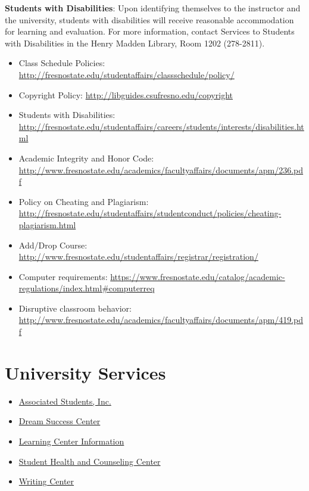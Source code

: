 \textbf{Students with Disabilities}: Upon identifying themselves to the
instructor and the university, students with disabilities will receive
reasonable accommodation for learning and evaluation. For more
information, contact Services to Students with Disabilities in the Henry
Madden Library, Room 1202 (278-2811).

\begin{itemize}
\tightlist
\item
  Class Schedule Policies:
  \url{http://fresnostate.edu/studentaffairs/classschedule/policy/}
\item
  Copyright Policy: \url{http://libguides.csufresno.edu/copyright}
\item
  Students with Disabilities:
  \url{http://fresnostate.edu/studentaffairs/careers/students/interests/disabilities.html}
\item
  Academic Integrity and Honor Code:
  \url{http://www.fresnostate.edu/academics/facultyaffairs/documents/apm/236.pdf}
\item
  Policy on Cheating and Plagiarism:
  \url{http://fresnostate.edu/studentaffairs/studentconduct/policies/cheating-plagiarism.html}
\item
  Add/Drop Course:
  \url{http://www.fresnostate.edu/studentaffairs/registrar/registration/}
\item
  Computer requirements:
  \url{https://www.fresnostate.edu/catalog/academic-regulations/index.html\#computerreq}
\item
  Disruptive classroom behavior:
  \url{http://www.fresnostate.edu/academics/facultyaffairs/documents/apm/419.pdf}
\end{itemize}

\hypertarget{university-services}{%
\section{University Services}\label{university-services}}

\begin{itemize}
\tightlist
\item
  \href{http://fresnostateasi.org/}{Associated Students, Inc.}
\item
  \href{http://fresnostate.edu/studentaffairs/dsc/index.html}{Dream
  Success Center}
\item
  \href{http://fresnostate.edu/studentaffairs/lrc}{Learning Center
  Information}
\item
  \href{https://www.fresnostate.edu/studentaffairs/health/}{Student
  Health and Counseling Center}
\item
  \href{http://www.fresnostate.edu/artshum/writingcenter/}{Writing
  Center}
\end{itemize}
